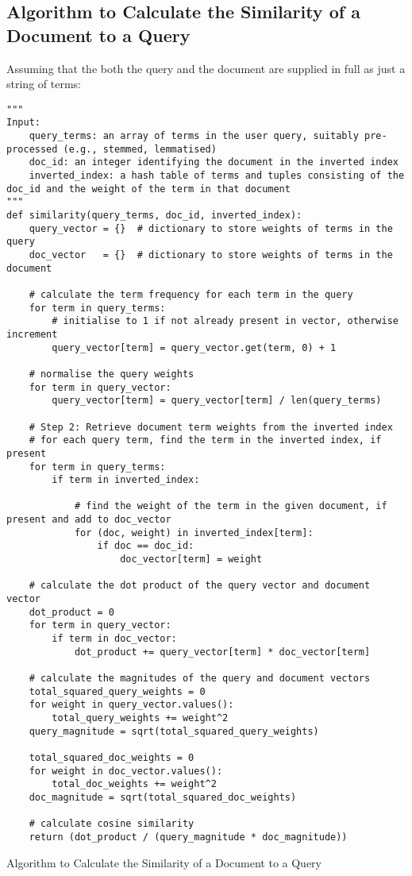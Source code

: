 \documentclass[a4paper]{article}
\newenvironment{code}{\captionsetup{type=listing}}{}
\begin{document}
\subsection{Algorithm to Calculate the Similarity of a Document to a Query}
Assuming that the both the query and the document are supplied in full as just a string of terms:
\begin{code}
%
\begin{verbatim}
"""
Input: 
    query_terms: an array of terms in the user query, suitably pre-processed (e.g., stemmed, lemmatised)
    doc_id: an integer identifying the document in the inverted index
    inverted_index: a hash table of terms and tuples consisting of the doc_id and the weight of the term in that document
"""
def similarity(query_terms, doc_id, inverted_index):
    query_vector = {}  # dictionary to store weights of terms in the query
    doc_vector   = {}  # dictionary to store weights of terms in the document

    # calculate the term frequency for each term in the query
    for term in query_terms:
        # initialise to 1 if not already present in vector, otherwise increment
        query_vector[term] = query_vector.get(term, 0) + 1

    # normalise the query weights
    for term in query_vector:
        query_vector[term] = query_vector[term] / len(query_terms)

    # Step 2: Retrieve document term weights from the inverted index
    # for each query term, find the term in the inverted index, if present
    for term in query_terms:
        if term in inverted_index:

            # find the weight of the term in the given document, if present and add to doc_vector
            for (doc, weight) in inverted_index[term]:
                if doc == doc_id:
                    doc_vector[term] = weight

    # calculate the dot product of the query vector and document vector
    dot_product = 0
    for term in query_vector:
        if term in doc_vector:
            dot_product += query_vector[term] * doc_vector[term]

    # calculate the magnitudes of the query and document vectors
    total_squared_query_weights = 0
    for weight in query_vector.values():
        total_query_weights += weight^2
    query_magnitude = sqrt(total_squared_query_weights)

    total_squared_doc_weights = 0
    for weight in doc_vector.values():
        total_doc_weights += weight^2
    doc_magnitude = sqrt(total_squared_doc_weights)

    # calculate cosine similarity
    return (dot_product / (query_magnitude * doc_magnitude))
\end{verbatim}
\caption{Algorithm to Calculate the Similarity of a Document to a Query}
\end{code}
\end{document}
